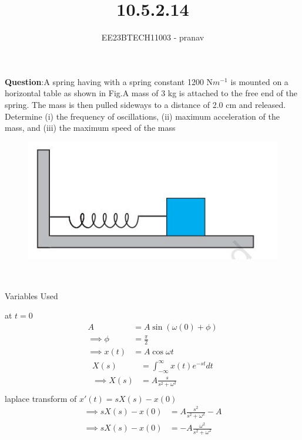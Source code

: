 \documentclass[journal,12pt,twocolumn]{IEEEtran}
\theoremstyle{remark}
\begin{document}

\vspace{3cm}

\title{10.5.2.14}
\author{EE23BTECH11003 - pranav}
\maketitle
\newpage

\bigskip
\renewcommand{\thefigure}{\arabic{figure}}
\renewcommand{\thetable}{\arabic{table}}

\textbf{Question}:A spring having with a spring constant 1200 N$m^{-1}$ is mounted on a horizontal
table as shown in Fig.A mass of 3 kg is attached to the free end of the
spring. The mass is then pulled sideways to a distance of 2.0 cm and released.\\
Determine (i) the frequency of oscillations, (ii) maximum acceleration of the mass,
and (iii) the maximum speed of the mass
\begin{figure}[h!]
    \centering
    \includegraphics[width=0.5\linewidth]{figs/figure.jpg}
    \caption{ }
    
\end{figure}\\
\solution
\begin{table}[h!]
    \centering
    
    \caption{Variables Used}
\end{table}
at $t=0$
\begin{align}
A&=A\sin{(\omega(0)+\phi)}\\
\implies \phi&=\frac{\pi}{2}\\
\implies x(t)&=A\cos{\omega t} 
\end{align}
\begin{align}
X(s)&=\int_{-\infty}^{\infty} x(t)e^{-st}dt \\
\implies X(s)&=A\frac{s}{s^2+\omega^2}\\
\end{align}
laplace transform of $x'(t)=sX(s)-x(0)$
\begin{align}
 \implies sX(s)-x(0)&=A\frac{s^2}{s^2+\omega^2}-A\\
 \implies sX(s)-x(0)&=-A\frac{\omega^2}{s^2+\omega^2}\\
\end{align}
\end{document}
